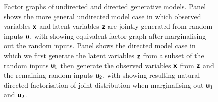 \begin{figure}[!t]
\begin{subfigure}[t]{.2\linewidth}
\centering
{}
\caption{}\label{sfig:directed-model-factor-graph-marginalised}
\end{subfigure}%
\caption[Undirected and directed generative models.]{Factor graphs of undirected and directed generative models. Panel  shows the more general undirected model case in which observed variables $\boldsymbol{\mathsf{x}}$ and latent variables $\boldsymbol{\mathsf{z}}$ are jointly generated from random inputs $\boldsymbol{\mathsf{u}}$, with  showing equivalent factor graph after marginalising out the random inputs. Panel  shows the directed model case in which we first generate the latent variables $\boldsymbol{\mathsf{z}}$ from a subset of the random inputs $\boldsymbol{\mathsf{u}}_{1}$ then generate the observed variables $\boldsymbol{\mathsf{x}}$ from $\boldsymbol{\mathsf{z}}$ and the remaining random inputs $\boldsymbol{\mathsf{u}}_{2}$, with  showing resulting natural directed factorisation of joint distribution when marginalising out $\boldsymbol{\mathsf{u}}_1$ and $\boldsymbol{\mathsf{u}}_2$.}
\label{fig:directed-undirected-model-graphs}
\end{figure}

